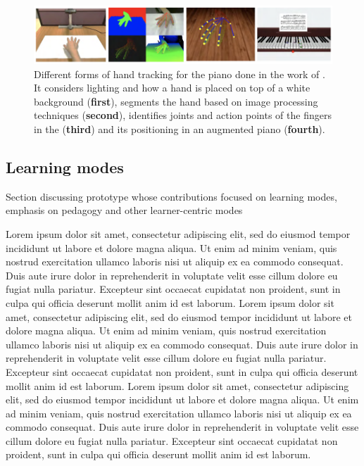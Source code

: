 \documentclass[manuscript,screen]{acmart}
\begin{document}
\begin{figure}[t]
    \centering
    \includegraphics[width=15cm]{figures/lianghandtrack.png}
    \caption{Different forms of hand tracking for the piano done in the work of \cite{liang2016barehanded}. It considers lighting and how a hand is placed on top of a white background (\textbf{first}), segments the hand based on image processing techniques (\textbf{second}), identifies joints and action points of the fingers in the (\textbf{third}) and its positioning in an augmented piano (\textbf{fourth}). }
    \label{fig:lianghandtrack}
\end{figure}



\subsection{Learning modes}
\label{subsec: learn}
Section discussing prototype whose contributions focused on learning modes, emphasis on pedagogy and other learner-centric modes

Lorem ipsum dolor sit amet, consectetur adipiscing elit, sed do eiusmod tempor incididunt ut labore et dolore magna aliqua. Ut enim ad minim veniam, quis nostrud exercitation ullamco laboris nisi ut aliquip ex ea commodo consequat. Duis aute irure dolor in reprehenderit in voluptate velit esse cillum dolore eu fugiat nulla pariatur. Excepteur sint occaecat cupidatat non proident, sunt in culpa qui officia deserunt mollit anim id est laborum. Lorem ipsum dolor sit amet, consectetur adipiscing elit, sed do eiusmod tempor incididunt ut labore et dolore magna aliqua. Ut enim ad minim veniam, quis nostrud exercitation ullamco laboris nisi ut aliquip ex ea commodo consequat. Duis aute irure dolor in reprehenderit in voluptate velit esse cillum dolore eu fugiat nulla pariatur. Excepteur sint occaecat cupidatat non proident, sunt in culpa qui officia deserunt mollit anim id est laborum. Lorem ipsum dolor sit amet, consectetur adipiscing elit, sed do eiusmod tempor incididunt ut labore et dolore magna aliqua. Ut enim ad minim veniam, quis nostrud exercitation ullamco laboris nisi ut aliquip ex ea commodo consequat. Duis aute irure dolor in reprehenderit in voluptate velit esse cillum dolore eu fugiat nulla pariatur. Excepteur sint occaecat cupidatat non proident, sunt in culpa qui officia deserunt mollit anim id est laborum.
\end{document}
